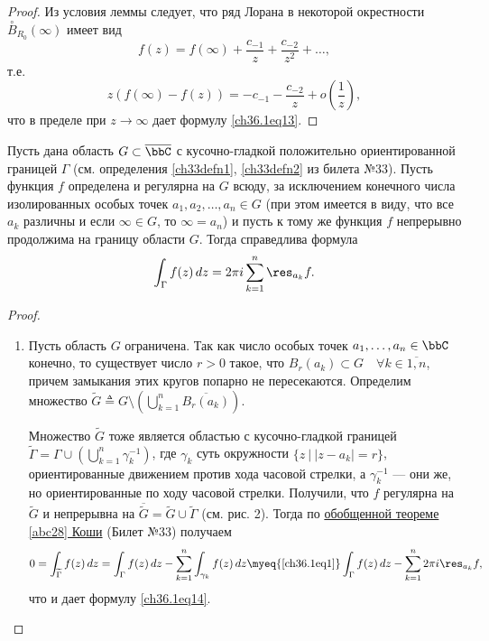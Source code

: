 \begin{proof}
Из условия леммы следует, что ряд Лорана в некоторой окрестности $\overset{\circ}{B}_{R_0}(\infty)$ имеет вид
$$
f(z) = f(\infty) + \frac{c_{-1}}{z} + \frac{c_{-2}}{z^2} + \ldots,
$$
т.е.
$$
z(f(\infty) - f(z)) = -c_{-1} - \frac{c_{-2}}{z} + o\left(\frac{1}{z}\right),
$$
что в пределе при $z \to \infty$ дает формулу \eqref{ch36.1eq13}.	

\end{proof}

\begin{leftbar}
\begin{thm}  \label{ch36.1T1}
Пусть дана область $G \subset \overline{\bbC}$ с кусочно-гладкой положительно ориентированной границей $\Gamma$ (см. определения \ref{ch33defn1}, \ref{ch33defn2} из билета №33). Пусть функция $f$ определена и регулярна на $G$ всюду, за исключением конечного числа изолированных особых точек $a_1,a_2,\ldots,a_n \in G$ (при этом имеется в виду, что все $a_k$ различны и если $\infty \in G$, то $\infty = a_n$) и пусть к тому же функция $f$ непрерывно продолжима на границу области $G$. Тогда справедлива формула
\begin{equation} \label{ch36.1eq14}
\int_\Gamma f(z) \,dz = 2 \pi i \sum_{k = 1}^{n} \res_{a_k} f.
\end{equation}
\end{thm}

\begin{proof}
\begin{enumerate}
\item Пусть область $G$ ограничена. Так как число особых точек $a_1,\ldots,a_n \in \bbC$ конечно, то существует число $r > 0$ такое, что $B_r(a_k) \subset G \quad \forall k \in \overline{1,n}$, причем замыкания этих кругов попарно не пересекаются. Определим множество $\widetilde{G} \triangleq G \setminus \left( \bigcup\limits_{k = 1}^{n} \overline{B_r(a_k)}\right)$.

Множество $\widetilde{G}$ тоже является областью с кусочно-гладкой границей $\widetilde{\Gamma} = \Gamma \cup \left( \bigcup\limits_{k = 1}^{n} \gamma_{k}^{-1} \right)$,	где $\gamma_k$ суть окружности $\{ z \: \big| \: |z - a_k| = r \}$, ориентированные движением против хода часовой стрелки, а $\gamma_{k}^{-1}$ --- они же, но ориентированные по ходу часовой стрелки. Получили, что $f$ регулярна на $\widetilde{G}$ и непрерывна на $\overline{\widetilde{G}} = \widetilde{G} \cup \widetilde{\Gamma}$ (см. рис. 2). Тогда по \hyperref[abc28]{обобщенной теореме \ref{abc28} Коши} (Билет №33) получаем
$$
0 = \int_{\widetilde{\Gamma}} f(z) \,dz = \int_{\Gamma} f(z) \,dz - \sum_{k = 1}^{n} \int_{\gamma_k} f(z) \,dz \myeq{\eqref{ch36.1eq1}} \int_{\Gamma} f(z) \,dz - \sum_{k = 1}^{n} 2\pi i \res_{a_k} f,
$$
что и дает формулу \eqref{ch36.1eq14}.



\end{enumerate}
\end{proof}
\end{leftbar}
